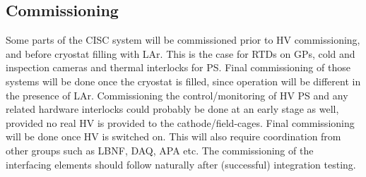\subsection{Commissioning}
\label{sec:fdsp-slow-cryo-install-commiss}

Some parts of the CISC system will be commissioned prior to HV commissioning, and before cryostat filling with LAr.
This is the case for RTDs on GPs, cold and inspection cameras and thermal interlocks for PS. Final commissioning of
those systems will be done once the cryostat is filled, since operation will be different in the presence of LAr.
Commissioning the control/monitoring of HV PS and any related hardware interlocks could probably be done at an early
stage as well, provided no real HV is provided to the cathode/field-cages. Final commissioning will be done once HV is
switched on. This will also require coordination from other groups such as LBNF, DAQ, APA etc. The commissioning of the
interfacing elements should follow naturally after (successful) integration testing.
